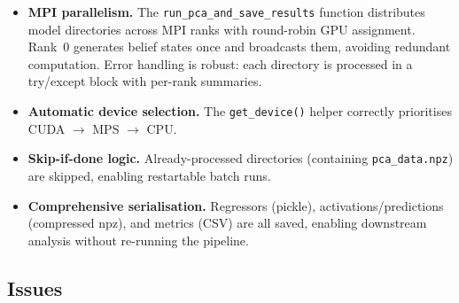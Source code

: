 \documentclass[11pt]{article}
\newcommand{\code}[1]{\texttt{#1}}
\newcommand{\file}[1]{\texttt{#1}}
\begin{document}
\begin{itemize}
  \item \textbf{MPI parallelism.}  The \code{run\_pca\_and\_save\_results} function distributes model directories across MPI ranks with round-robin GPU assignment.  Rank~0 generates belief states once and broadcasts them, avoiding redundant computation.  Error handling is robust: each directory is processed in a try/except block with per-rank summaries.

  \item \textbf{Automatic device selection.}  The \code{get\_device()} helper correctly prioritises CUDA $\to$ MPS $\to$ CPU.

  \item \textbf{Skip-if-done logic.}  Already-processed directories (containing \file{pca\_data.npz}) are skipped, enabling restartable batch runs.

  \item \textbf{Comprehensive serialisation.}  Regressors (pickle), activations/predictions (compressed npz), and metrics (CSV) are all saved, enabling downstream analysis without re-running the pipeline.
\end{itemize}

\subsection{Issues}
\end{document}
